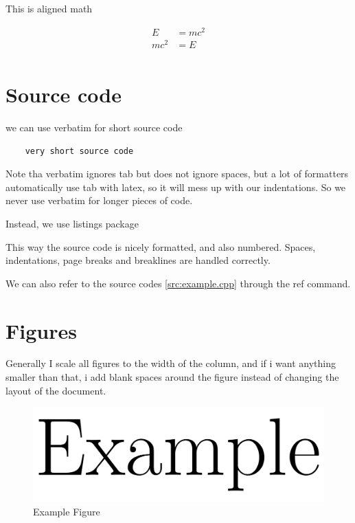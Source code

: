 \documentclass{article}
\begin{document}
This is aligned math

\begin{equation}
	\begin{aligned}
		E    & = mc^2 \\
		mc^2 & = E    \\
	\end{aligned}
\end{equation}

\section{Source code}

we can use verbatim for short source code

\begin{verbatim}
    very short source code
\end{verbatim}

Note tha verbatim ignores tab but does not ignore spaces, but a lot of formatters automatically use tab with latex, so it will mess up with our indentations.
So we never use verbatim for longer pieces of code.

Instead, we use listings package



This way the source code is nicely formatted, and also numbered.
Spaces, indentations, page breaks and breaklines are handled correctly.

We can also refer to the source codes \ref{src:example.cpp} through the ref command.

\section{Figures}

Generally I scale all figures to the width of the column, and if i want anything smaller than that, i add blank spaces around the figure instead of changing the layout of the document.

\begin{figure}
	\begin{center}
		\includegraphics[width=0.75\columnwidth]{figs/example.png}
	\end{center}
	\caption{Example Figure}
	\label{fig:example.png}
\end{figure}
\end{document}
